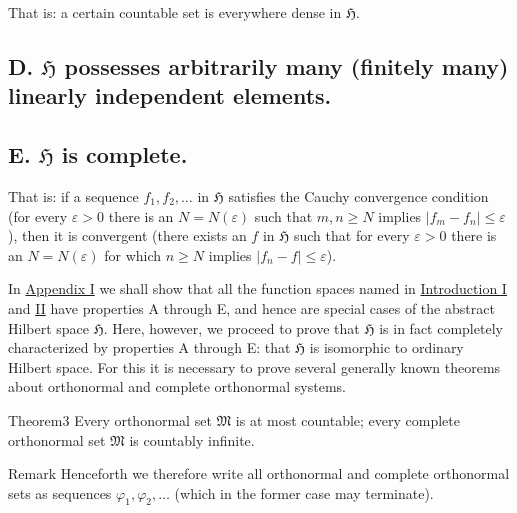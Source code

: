 ﻿\documentclass[paper=b5,fontsize=13pt,bookmarkpackage=false,twoside]{scrartcl}
\begin{document}
That is: a certain countable set is everywhere dense in $\mathfrak H$.

\subsection*{D. $\mathfrak H$ possesses arbitrarily many (finitely many) linearly independent elements.\texorpdfstring{\protect\footnotemark}{}}\label{axiom:D}

\subsection*{E. $\mathfrak H$ is complete.}\label{axiom:E}

That is: if a sequence $f_1,f_2,\ldots$ in $\mathfrak H$ satisfies the Cauchy convergence condition (for every $\varepsilon>0$ there is an $N=N(\varepsilon)$ such that $m,n\ge N$ implies $|f_m-f_n|\le\varepsilon$), then it is convergent (there exists an $f$ in $\mathfrak H$ such that for every $\varepsilon>0$ there is an $N=N(\varepsilon)$ for which $n\ge N$ implies $|f_n-f|\le\varepsilon$).

In \hyperref[app:I]{Appendix I} we shall show that all the function spaces named in \hyperref[intro:I]{Introduction I} and \hyperref[intro:II]{II} have properties A through E, and hence are special cases of the abstract Hilbert space $\mathfrak H$. Here, however, we proceed to prove that $\mathfrak H$ is in fact completely characterized by properties A through E: that $\mathfrak H$ is isomorphic to ordinary Hilbert space. For this it is necessary to prove several generally known theorems about orthonormal and complete orthonormal systems.

\begin{namedstatement}{Theorem}{3}\label{thm:3}
Every orthonormal set $\mathfrak M$ is at most countable; every complete orthonormal set $\mathfrak M$ is countably infinite.
\end{namedstatement}

\begin{namedstatement}{Remark}{}\label{rem:after-thm3}
Henceforth we therefore write all orthonormal and complete orthonormal sets as sequences $\varphi_1,\varphi_2,\ldots$ (which in the former case may terminate).
\end{namedstatement}
\end{document}
